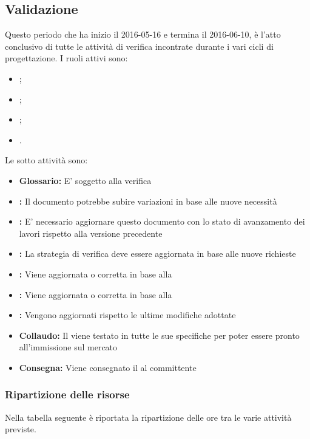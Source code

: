 \documentclass[12pt,a4paper]{article}
\begin{document}
\subsection{Validazione}
Questo periodo che ha inizio il 2016-05-16 e termina il 2016-06-10, è l'atto conclusivo di tutte le attività di verifica incontrate durante i vari cicli di progettazione. I ruoli attivi sono:
\begin{itemize}
	\item \PM{};
	\item \AM{};
	\item \PG{};
	\item \VR{}.
\end{itemize}
Le sotto attività sono:
\begin{itemize}
	\item \textbf{Glossario:} 
	E' soggetto alla verifica
	\item \textbf{\NdP{}:}
	Il documento potrebbe subire variazioni in base alle nuove necessità
	\item \textbf{\PdP{}:}
	E' necessario aggiornare questo documento con lo stato di avanzamento dei lavori rispetto alla versione precedente
	\item \textbf{\PdQ{}:}
	La strategia di verifica deve essere aggiornata in base alle nuove richieste
	\item \textbf{\DP:}
	Viene aggiornata o corretta in base alla \RQ{}
	\item \textbf{\ST:}
	Viene aggiornata o corretta in base alla \RQ{}
	\item \textbf{\MU:}
	Vengono aggiornati rispetto le ultime modifiche adottate
	\item \textbf{Collaudo:}
	Il  viene testato in tutte le sue specifiche per poter essere pronto all'immissione sul mercato
	\item \textbf{Consegna:}
	Viene consegnato il  al committente
\end{itemize}

\newpage
\subsubsection{Ripartizione delle risorse}
Nella tabella seguente è riportata la ripartizione delle ore tra le varie attività previste.
\end{document}
